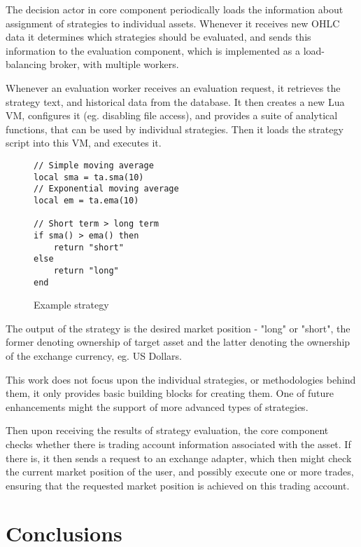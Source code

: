\documentclass{ExcelAtFIT}
\begin{document}
    The decision actor in core component periodically loads the information about assignment of strategies to individual assets.
    Whenever it receives new OHLC data it determines which strategies should be evaluated, and sends this information
    to the evaluation component, which is implemented as a load-balancing broker, with multiple workers.

    Whenever an evaluation worker receives an evaluation request, it retrieves the strategy text, and historical data from the
    database. It then creates a new Lua VM, configures it (eg. disabling file access), and provides a suite
    of analytical functions, that can be used by individual strategies. Then it loads the strategy script into this VM, and executes it.

    \begin{figure}[H]
        \centering
        \begin{verbatim}
// Simple moving average
local sma = ta.sma(10)
// Exponential moving average
local em = ta.ema(10)

// Short term > long term
if sma() > ema() then
    return "short"
else
    return "long"
end
        \end{verbatim}
        \caption{Example strategy}
    \end{figure}


    The output of the strategy is the desired market position - "long" or "short", the former denoting ownership of target
    asset and the latter denoting the ownership of the exchange currency, eg. US Dollars.

    This work does not focus upon the individual strategies, or methodologies behind them, it only provides basic building blocks
    for creating them. One of future enhancements might the support of more advanced types of strategies.

    Then upon receiving the results of strategy evaluation, the core component checks whether there is trading account information
    associated with the asset. If there is, it then sends a request to an exchange adapter,
    which then might check the current market position of the user, and possibly execute one or more trades, ensuring that the requested market position is achieved on this trading account.


    \section{Conclusions}
    \label{sec:Conclusions}
\end{document}
